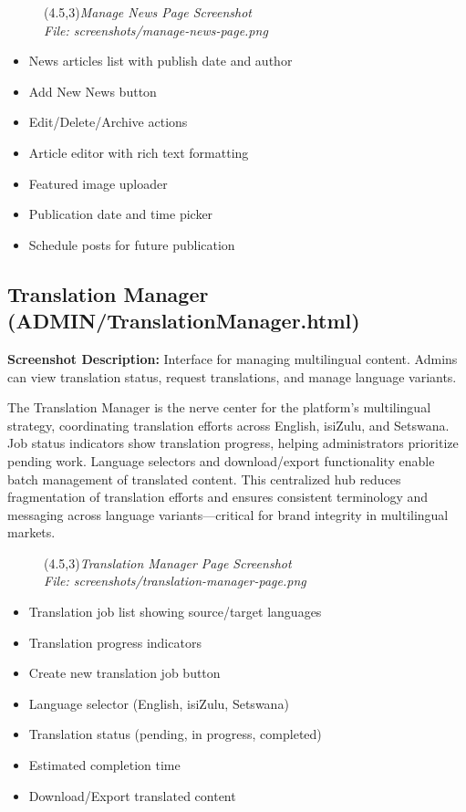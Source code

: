 \documentclass[a4paper,12pt]{article}
\begin{document}
\begin{figure}[h]
    \centering
    \framebox(4.5,3){\textit{Manage News Page Screenshot}}\\
    \small\textit{File: screenshots/manage-news-page.png}
\end{figure}

\begin{itemize}
    \item News articles list with publish date and author
    \item Add New News button
    \item Edit/Delete/Archive actions
    \item Article editor with rich text formatting
    \item Featured image uploader
    \item Publication date and time picker
    \item Schedule posts for future publication
\end{itemize}

\subsection{Translation Manager (ADMIN/TranslationManager.html)}
\textbf{Screenshot Description:} Interface for managing multilingual content. Admins can view translation status, request translations, and manage language variants.

The Translation Manager is the nerve center for the platform's multilingual strategy, coordinating translation efforts across English, isiZulu, and Setswana. Job status indicators show translation progress, helping administrators prioritize pending work. Language selectors and download/export functionality enable batch management of translated content. This centralized hub reduces fragmentation of translation efforts and ensures consistent terminology and messaging across language variants—critical for brand integrity in multilingual markets.

\begin{figure}[h]
    \centering
    \framebox(4.5,3){\textit{Translation Manager Page Screenshot}}\\
    \small\textit{File: screenshots/translation-manager-page.png}
\end{figure}

\begin{itemize}
    \item Translation job list showing source/target languages
    \item Translation progress indicators
    \item Create new translation job button
    \item Language selector (English, isiZulu, Setswana)
    \item Translation status (pending, in progress, completed)
    \item Estimated completion time
    \item Download/Export translated content
\end{itemize}
\end{document}
